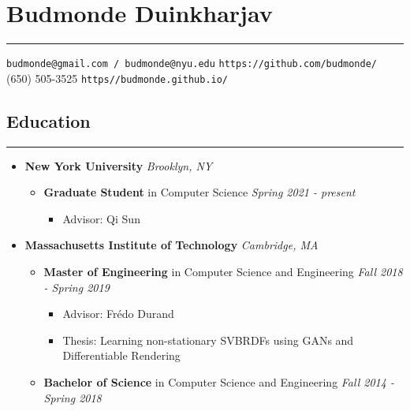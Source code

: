 \documentclass[10pt]{article}
\begin{document}
\section*{Budmonde Duinkharjav}
\vspace*{-\baselineskip}
\noindent\rule{\linewidth}{0.4pt}

\begin{flushleft}
\texttt{budmonde@gmail.com / budmonde@nyu.edu} \hfill \texttt{https://github.com/budmonde/} \linebreak
(650) 505-3525 \hfill \texttt{https//budmonde.github.io/}
\end{flushleft}

\subsection*{Education}
\vspace*{-\baselineskip}
\noindent\rule{\linewidth}{0.4pt}

\begin{itemize}
    \item
        \textbf{New York University} \hfill \emph{Brooklyn, NY}
        \begin{itemize}
            \item
                \textbf{Graduate Student} in Computer Science \hfill \emph{Spring 2021 - present}
                \begin{itemize}
                    \item Advisor: Qi Sun
                \end{itemize}
        \end{itemize}
    \item
        \textbf{Massachusetts Institute of Technology} \hfill \emph{Cambridge, MA}
        \begin{itemize}
            \item
                \textbf{Master of Engineering} in Computer Science and Engineering \hfill \emph{Fall 2018 - Spring 2019}
                \begin{itemize}
                    \item Advisor: Frédo Durand
                    \item Thesis: Learning non-stationary SVBRDFs using GANs and Differentiable Rendering
                \end{itemize}
            \item 
                \textbf{Bachelor of Science} in Computer Science and Engineering \hfill \emph{Fall 2014 - Spring 2018}
        \end{itemize}
\end{itemize}
\end{document}
